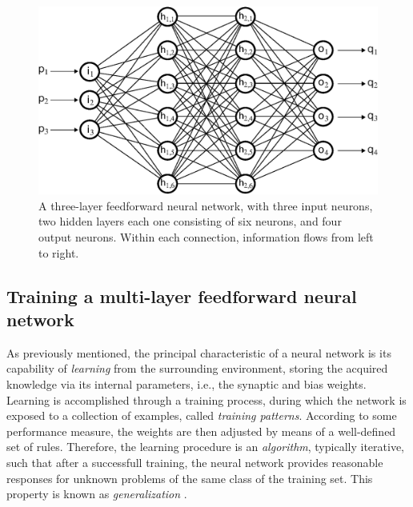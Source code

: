 \documentclass{elsarticle}
\numberwithin{equation}{section}
\theoremstyle{theorem}
\theoremstyle{definition}
\theoremstyle{remark}
\theoremstyle{proposition}
\numberwithin{figure}{section}
\begin{document}
		\begin{figure}[t]
			\center
			\includegraphics[scale = 0.55]{neural_network_bis.eps}
			
			\caption{A three-layer feedforward neural network, with three input neurons, two hidden layers each one consisting of six neurons, and four output neurons. Within each connection, information flows from left to right.}
			\label{fig:neural-network}
		\end{figure}
		
		
	
	\subsection{Training a multi-layer feedforward neural network}
	\label{section:Training a multi-layer feedforward neural network}
	
		As previously mentioned, the principal characteristic of a neural network is its capability of \emph{learning} from the surrounding environment, storing the acquired knowledge via its internal parameters, i.e., the synaptic and bias weights. Learning is accomplished through a training process, during which the network is exposed to a collection of examples, called \emph{training patterns}. According to some performance measure, the weights are then adjusted by means of a well-defined set of rules. Therefore, the learning procedure is an \emph{algorithm}, typically iterative, such that after a successfull training, the neural network provides reasonable responses for unknown problems of the same class of the training set. This property is known as \emph{generalization} \cite{Kri07}. 
		
\end{document}
